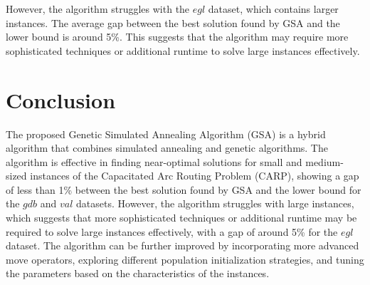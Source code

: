 \documentclass[conference]{IEEEtran}
\begin{document}
However, the algorithm struggles with the $egl$ dataset, which contains larger instances.
The average gap between the best solution found by GSA and the lower bound is around 5\%.
This suggests that the algorithm may require more sophisticated techniques or additional runtime to solve large instances effectively.

\section{Conclusion}
\label{sec:conclusion}

The proposed Genetic Simulated Annealing Algorithm (GSA) is a hybrid algorithm that combines simulated annealing and genetic algorithms.
The algorithm is effective in finding near-optimal solutions for small and medium-sized instances of the Capacitated Arc Routing Problem (CARP), showing a gap of less than 1\% between the best solution found by GSA and the lower bound for the $gdb$ and $val$ datasets.
However, the algorithm struggles with large instances, which suggests that more sophisticated techniques or additional runtime may be required to solve large instances effectively, with a gap of around 5\% for the $egl$ dataset.
The algorithm can be further improved by incorporating more advanced move operators, exploring different population initialization strategies, and tuning the parameters based on the characteristics of the instances.

\printbibliography
\end{document}
